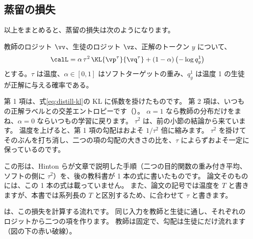 \subsection{蒸留の損失}\label{sec:distill-loss-def}

以上をまとめると、蒸留の損失は次のようになります。
\begin{definition}[蒸留の損失]
教師のロジット $\vv$、生徒のロジット $\vz$、正解のトークン $y$ について、
\begin{equation}
\calL=\alpha\,\tau^2\,\KL{\vp^\tau}{\vq^\tau}+(1-\alpha)\,\bigl(-\log q^{1}_y\bigr)
\label{eq:distill-loss}
\end{equation}
とする。$\tau$ は温度、$\alpha\in[0,1]$ はソフトターゲットの重み、$q^1_y$ は温度 1 の生徒が正解に与える確率である。
\end{definition}
第 1 項は、式\eqref{eq:distill-kl}の KL に係数を掛けたものです。
第 2 項は、いつもの正解ラベルとの交差エントロピーです（）。
$\alpha=1$ なら教師の分布だけをまね、$\alpha=0$ ならいつもの学習に戻ります。
$\tau^2$ は、前の小節の結論から来ています。
温度を上げると、第 1 項の勾配はおよそ $1/\tau^2$ 倍に縮みます。
$\tau^2$ を掛けてそのぶんを打ち消し、二つの項の勾配の大きさの比を、$\tau$ によらずおよそ一定に保っているのです。

この形は、Hinton らが文章で説明した手順（二つの目的関数の重み付き平均、ソフトの側に $\tau^2$）を、後の教科書が 1 本の式に書いたものです。
論文そのものには、この 1 本の式は載っていません。
また、論文の記号では温度を $T$ と書きますが、本書では系列長の $T$ と区別するため、に合わせて $\tau$ と書きます。

は、この損失を計算する流れです。
同じ入力を教師と生徒に通し、それぞれのロジットから二つの項を作ります。
教師は固定で、勾配は生徒にだけ流れます（図の下の赤い破線）。

